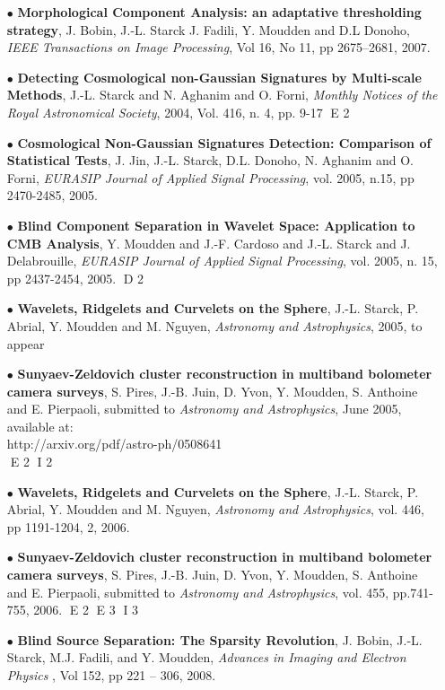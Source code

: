 \begin{itemize}
\item[$\bullet$]{   \textbf{  Morphological Component Analysis: an adaptative thresholding strategy},  J. Bobin, J.-L. Starck J. Fadili, Y. Moudden and D.L Donoho,  \emph{IEEE Transactions on Image Processing}, Vol 16, No 11, pp 2675--2681, 2007. }
\item[$\bullet$]{\textbf{ Detecting Cosmological non-Gaussian Signatures by Multi-scale Methods}, J.-L. Starck and N. Aghanim and O. Forni, \emph{Monthly Notices of the Royal Astronomical Society}, 2004, Vol. 416, n. 4, pp. 9-17 }
E 2
\item[$\bullet$]{ \textbf{ Cosmological Non-Gaussian Signatures Detection: Comparison of Statistical Tests}, J. Jin,  J.-L. Starck,  D.L. Donoho,  N. Aghanim and O. Forni, \emph{EURASIP Journal of Applied Signal Processing},  vol. 2005, n.15, pp 2470-2485, 2005.}
\item[$\bullet$]{ \textbf{ Blind Component Separation in Wavelet Space: Application to {CMB} Analysis}, Y. Moudden and J.-F. Cardoso and J.-L. Starck and J. Delabrouille, 
\emph{EURASIP Journal of Applied Signal Processing}, vol. 2005, n. 15, pp 2437-2454, 2005.}
D 2
\item[$\bullet$]{ \textbf{ Wavelets, Ridgelets and Curvelets on the Sphere},  J.-L. Starck,  P. Abrial, Y. Moudden and M. Nguyen, \emph{Astronomy and Astrophysics}, 2005, to appear}
\item[$\bullet$]{ \textbf{ Sunyaev-Zeldovich cluster reconstruction in multiband  bolometer camera surveys}, S. Pires, J.-B. Juin, D. Yvon, Y. Moudden, S. Anthoine and E. Pierpaoli, submitted to \emph{Astronomy and Astrophysics}, June 2005, available at: \\
 http://arxiv.org/pdf/astro-ph/0508641}\\
E 2
I 2
\item[$\bullet$]{ \textbf{ Wavelets, Ridgelets and Curvelets on the Sphere},  J.-L. Starck,  P. Abrial, Y. Moudden and M. Nguyen, \emph{Astronomy and Astrophysics}, vol. 446, pp 1191-1204, 2, 2006.}
\item[$\bullet$]{ \textbf{ Sunyaev-Zeldovich cluster reconstruction in multiband  bolometer camera surveys}, S. Pires, J.-B. Juin, D. Yvon, Y. Moudden, S. Anthoine and E. Pierpaoli, submitted to \emph{Astronomy and Astrophysics}, vol. 455,  pp.741-755, 2006.}
E 2
E 3
I 3
\item[$\bullet$] {\textbf{Blind Source Separation: The Sparsity Revolution}, J. Bobin, J.-L. Starck, M.J. Fadili, and Y. Moudden, \textit{Advances in Imaging and Electron Physics }, Vol 152, pp 221 -- 306, 2008.}

\end{itemize}

